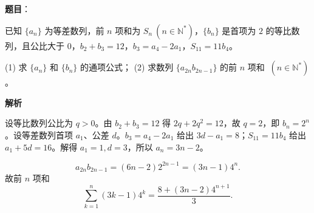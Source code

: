 \begin{answer}

\textbf{题目}：

已知 $\{a_n\}$ 为等差数列，前 $n$ 项和为 $S_n\ (n\in\mathbb N^*)$，$\{b_n\}$ 是首项为 $2$ 的等比数列，且公比大于 $0$，$b_2+b_3=12$，$b_3=a_4-2a_1$，$S_{11}=11b_4$。

(1)   求 $\{a_n\}$ 和 $\{b_n\}$ 的通项公式；
(2)   求数列 $\{a_{2n}b_{2n-1}\}$ 的前 $n$ 项和 $\ (n\in\mathbb N^*)$。

\textbf{解析}


设等比数列公比为 $q>0$。由 $b_2+b_3=12$ 得 $2q+2q^2=12$，故 $q=2$，即 $b_n=2^n$。设等差数列首项 $a_1$、公差 $d$。$b_3=a_4-2a_1$ 给出 $3d-a_1=8$；$S_{11}=11b_4$ 给出 $a_1+5d=16$。解得 $a_1=1,d=3$，所以 $a_n=3n-2$。


\nopagebreak[4]
\[
a_{2n}b_{2n-1}=(6n-2)2^{2n-1}=(3n-1)4^n.
\]
故前 $n$ 项和
\nopagebreak[4]
\[
\sum_{k=1}^n(3k-1)4^k=\frac{8+(3n-2)4^{n+1}}3.
\]



\end{answer}
